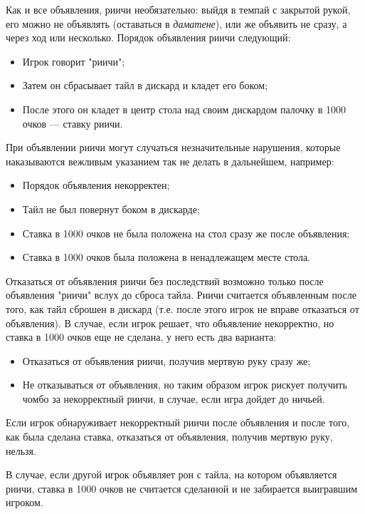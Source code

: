 Как и все объявления, риичи необязательно: выйдя в темпай с закрытой рукой, его можно не объявлять (оставаться в \textit{даматене}), или же объявить не сразу, а через ход или несколько. Порядок объявления риичи следующий:

\begin{itemize}
	\item Игрок говорит "риичи";
	\item Затем он сбрасывает тайл в дискард и кладет его боком;
	\item После этого он кладет в центр стола над своим дискардом палочку в 1000 очков --- ставку риичи.
\end{itemize}

При объявлении риичи могут случаться незначительные нарушения, которые наказываются вежливым указанием так не делать в дальнейшем, например:
\begin{itemize}
	\item Порядок объявления некорректен;
	\item Тайл не был повернут боком в дискарде;
	\item Ставка в 1000 очков не была положена на стол сразу же после объявления;
	\item Ставка в 1000 очков была положена в ненадлежащем месте стола.
\end{itemize}

Отказаться от объявления риичи без последствий возможно только после объявления "риичи" вслух до сброса тайла. Риичи считается объявленным после того, как тайл сброшен в дискард (т.е. после этого игрок не вправе отказаться от объявления). В случае, если игрок решает, что объявление некорректно, но ставка в 1000 очков еще не сделана, у него есть два варианта:

\begin{itemize}
	\item Отказаться от объявления риичи, получив мертвую руку сразу же;
	\item Не отказываться от объявления, но таким образом игрок рискует получить чомбо за некорректный риичи, в случае, если игра дойдет до ничьей.
\end{itemize}

Если игрок обнаруживает некорректный риичи после объявления и после того, как была сделана ставка, отказаться от объявления, получив мертвую руку, нельзя.

В случае, если другой игрок объявляет рон с тайла, на котором объявляется риичи, ставка в 1000 очков не считается сделанной и не забирается выигравшим игроком.

